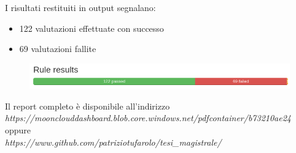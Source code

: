 \documentclass[../main.tex]{subfiles}
\begin{document}
I risultati restituiti in output segnalano:
\begin{itemize}
    \item 122 valutazioni effettuate con successo
    \item 69 valutazioni fallite
\end{itemize}
\begin{figure}[H]
    \centering
    \includegraphics[width=15cm]{immagini/test_oscap_2.png}
\end{figure}

Il report completo è disponibile all'indirizzo \\
\textit{https://moonclouddashboard.blob.core.windows.net/pdfcontainer/b73210ae24}    \\   
oppure \\
\textit{https://www.github.com/patriziotufarolo/tesi\_magistrale/} \\

\end{document}
